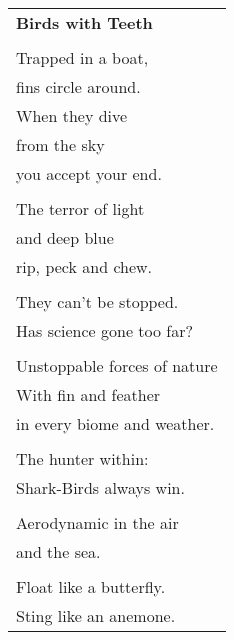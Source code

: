 \documentclass{article}
\begin{document}
\begin{center}
\begin{tabular}{l}
\textbf{Birds with Teeth} \\
\\
Trapped in a boat, \\
fins circle around. \\
When they dive \\
from the sky \\
you accept your end. \\
\\
The terror of light \\
and deep blue \\
rip, peck and chew. \\
\\
They can't be stopped. \\
Has science gone too far? \\
\\
Unstoppable forces of nature \\
With fin and feather \\
in every biome and weather. \\
\\
The hunter within: \\
Shark-Birds always win. \\
\\
Aerodynamic in the air \\
and the sea. \\
\\
Float like a butterfly. \\
Sting like an anemone. \\
\end{tabular}
\end{center}
\end{document}
